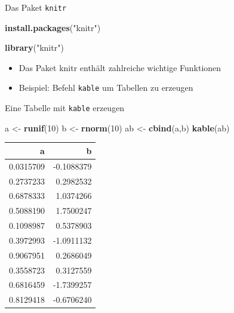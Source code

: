 \documentclass[ignorenonframetext,]{beamer}
\newenvironment{Shaded}{}{}
\newcommand{\KeywordTok}[1]{\textcolor[rgb]{0.00,0.44,0.13}{\textbf{{#1}}}}
\newcommand{\DecValTok}[1]{\textcolor[rgb]{0.25,0.63,0.44}{{#1}}}
\newcommand{\StringTok}[1]{\textcolor[rgb]{0.25,0.44,0.63}{{#1}}}
\newcommand{\NormalTok}[1]{{#1}}
\providecommand{\tightlist}{%
\setlength{\itemsep}{0pt}\setlength{\parskip}{0pt}}
\begin{document}
\begin{frame}[fragile]{Das Paket \texttt{knitr}}

\begin{Shaded}
\begin{Highlighting}[]
\KeywordTok{install.packages}\NormalTok{(}\StringTok{"knitr"}\NormalTok{)}
\end{Highlighting}
\end{Shaded}

\begin{Shaded}
\begin{Highlighting}[]
\KeywordTok{library}\NormalTok{(}\StringTok{"knitr"}\NormalTok{)}
\end{Highlighting}
\end{Shaded}

\begin{itemize}
\tightlist
\item
  Das Paket knitr enthält zahlreiche wichtige Funktionen
\item
  Beispiel: Befehl \texttt{kable} um Tabellen zu erzeugen
\end{itemize}

\end{frame}

\begin{frame}[fragile]{Eine Tabelle mit \texttt{kable} erzeugen}

\begin{Shaded}
\begin{Highlighting}[]
\NormalTok{a <-}\StringTok{ }\KeywordTok{runif}\NormalTok{(}\DecValTok{10}\NormalTok{)}
\NormalTok{b <-}\StringTok{ }\KeywordTok{rnorm}\NormalTok{(}\DecValTok{10}\NormalTok{)}
\NormalTok{ab <-}\StringTok{ }\KeywordTok{cbind}\NormalTok{(a,b)}
\KeywordTok{kable}\NormalTok{(ab)}
\end{Highlighting}
\end{Shaded}

\begin{longtable}[]{@{}rr@{}}
\toprule
a & b\tabularnewline
\midrule
\endhead
0.0315709 & -0.1088379\tabularnewline
0.2737233 & 0.2982532\tabularnewline
0.6878333 & 1.0374266\tabularnewline
0.5088190 & 1.7500247\tabularnewline
0.1098987 & 0.5378903\tabularnewline
0.3972993 & -1.0911132\tabularnewline
0.9067951 & 0.2686049\tabularnewline
0.3558723 & 0.3127559\tabularnewline
0.6816459 & -1.7399257\tabularnewline
0.8129418 & -0.6706240\tabularnewline
\bottomrule
\end{longtable}

\end{frame}
\end{document}
